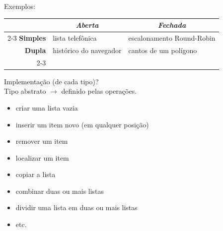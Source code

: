 \begin{frame}[label=notas]
	Exemplos:
	\begin{center}
		\begin{tabular}{r|l|l|}
			\multicolumn{1}{c}{} & \multicolumn{1}{c|}{\emph{Aberta}} & \multicolumn{1}{c}{\emph{Fechada}}\\\cline{2-3}
			\textbf{Simples} & lista telefônica & escalonamento Round-Robin \\\hline
			\textbf{Dupla} & histórico do navegador & cantos de um polígono \\\cline{2-3}
		\end{tabular}
	\end{center}
\end{frame}

\begin{frame}[label=notas]
	Implementação (de cada tipo)? 
	\\\pause\vfill
	Tipo abstrato $\rightarrow$ definido pelas operações. \pause
	\begin{itemize}
		\item criar uma lista vazia
		\item inserir um item novo (em qualquer posição)
		\item remover um item
		\item localizar um item
		\item copiar a lista
		\item combinar duas ou mais listas
		\item dividir uma lista em duas ou mais listas
		\item etc.
	\end{itemize}
\end{frame}

	

